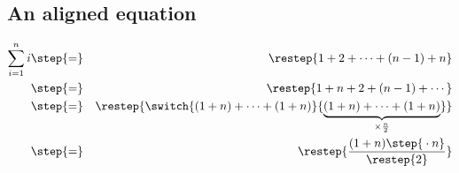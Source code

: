 \documentclass[portrait,semrot]{seminar}
\begin{document}
\begin{slide}
\centerslidesfalse
\section{An aligned equation}

\pause


\parstepwise
{%
  \begin{eqnarray}
    \sum_{i=1}^{n} i & \step{=} & \restep{1 + 2 + \cdots + (n-1) + n}\\
                     & \step{=} & \restep{1 + n + 2 + (n-1) + \cdots}\\
                     & \step{=} & \restep
                                  {%
                                    \switch
                                    {%
                                      \vphantom{\underbrace{(1 + n) + \cdots + (1 + n)}_{\times\frac{n}{2}}}%
                                      (1 + n) + \cdots + (1 + n)%
                                      }
                                    {\underbrace{(1 + n) + \cdots + (1 + n)}_{\times\frac{n}{2}}}%
                                    }
                                  \\
                     & \step{=} & \restep{\frac{(1 + n)\step{{}\cdot n}}{\restep{2}}}
  \end{eqnarray}
}




\end{slide}
\end{document}
